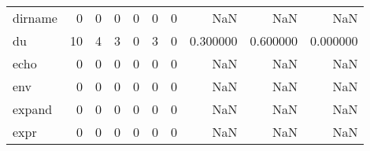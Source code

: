 \begin{tabular}{lrrrrrrrrr}
dirname   &                                                  0 &                                                  0 &                                                  0 &                                                  0 &                                                  0 &                                                  0 &                                                NaN &                                    NaN &                                  NaN \\
du        &                                                 10 &                                                  4 &                                                  3 &                                                  0 &                                                  3 &                                                  0 &                                           0.300000 &                               0.600000 &                             0.000000 \\
echo      &                                                  0 &                                                  0 &                                                  0 &                                                  0 &                                                  0 &                                                  0 &                                                NaN &                                    NaN &                                  NaN \\
env       &                                                  0 &                                                  0 &                                                  0 &                                                  0 &                                                  0 &                                                  0 &                                                NaN &                                    NaN &                                  NaN \\
expand    &                                                  0 &                                                  0 &                                                  0 &                                                  0 &                                                  0 &                                                  0 &                                                NaN &                                    NaN &                                  NaN \\
expr      &                                                  0 &                                                  0 &                                                  0 &                                                  0 &                                                  0 &                                                  0 &                                                NaN &                                    NaN &                                  NaN \\

\end{tabular}
